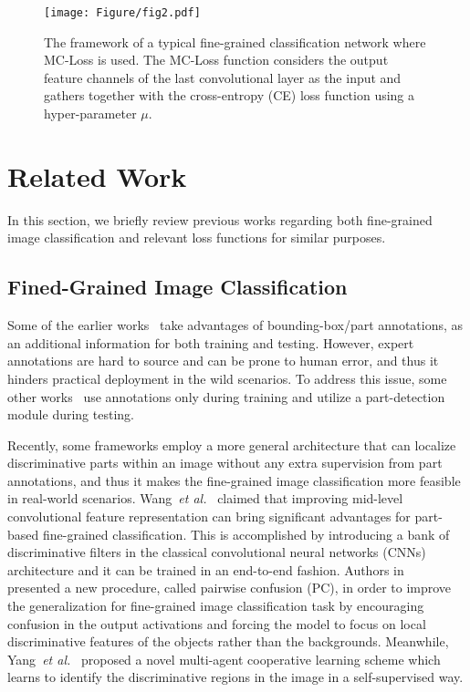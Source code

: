 \documentclass[journal]{IEEEtran}
\begin{document}
\begin{figure*}[!t]
  \centering
    \texttt{[image: Figure/fig2.pdf]}
  \caption{The framework of a typical fine-grained classification network where MC-Loss is used. The MC-Loss function considers the output feature channels of the last convolutional layer as the input and gathers together with the cross-entropy (CE) loss function using a hyper-parameter $\mu$.}
  \label{fig:network}
\end{figure*}
\section{Related Work}\label{RelatedWork}

In this section, we briefly review previous works regarding both fine-grained image classification and relevant loss functions for similar purposes.
\subsection{Fined-Grained Image Classification}

Some of the earlier works~\cite{berg2013poof,chai2013symbiotic,xie2013hierarchical,min2017new} take advantages of bounding-box/part annotations, as an additional information for both training and testing. However, expert annotations are hard to source and can be prone to human error, and thus it hinders practical deployment in the wild scenarios. To address this issue, some other works~\cite{branson2014bird,zhang2014part} use annotations only during training and utilize a part-detection module during testing.

Recently, some frameworks employ a more general architecture that can localize discriminative parts within an image without any extra supervision from part annotations, and thus it makes the fine-grained image classification more feasible in real-world scenarios. Wang~\emph{et al.}~\cite{wang2018learning} claimed that improving mid-level convolutional feature representation can bring significant advantages for part-based fine-grained classification. This is accomplished by introducing a bank of discriminative filters in the classical convolutional neural networks (CNNs) architecture and it can be trained in an end-to-end fashion. Authors in~\cite{dubey2018pairwise} presented a new procedure, called pairwise confusion (PC), in order to improve the generalization for fine-grained image classification task by encouraging confusion in the output activations and forcing the model to focus on local discriminative features of the objects rather than the backgrounds. Meanwhile, Yang~\emph{et al.}~\cite{yang2018learning} proposed a novel multi-agent cooperative learning scheme which learns to identify the discriminative regions in the image in a self-supervised way.
\end{document}
